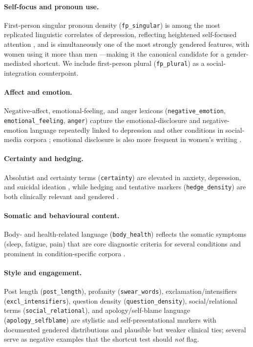 \documentclass[11pt]{article}
\begin{document}
\paragraph{Self-focus and pronoun use.}
First-person singular pronoun density (\texttt{fp\_singular}) is among the most replicated linguistic correlates of depression, reflecting heightened self-focused attention \citep{rude2004language,tausczik2010liwc}, and is simultaneously one of the most strongly gendered features, with women using it more than men \citep{newman2008gender,schwartz2013personality}---making it the canonical candidate for a gender-mediated shortcut. We include first-person plural (\texttt{fp\_plural}) as a social-integration counterpoint.

\paragraph{Affect and emotion.}
Negative-affect, emotional-feeling, and anger lexicons (\texttt{negative\_emotion}, \texttt{emotional\_feeling}, \texttt{anger}) capture the emotional-disclosure and negative-emotion language repeatedly linked to depression and other conditions in social-media corpora \citep{coppersmith,cohan,rude2004language}; emotional disclosure is also more frequent in women's writing \citep{newman2008gender}.

\paragraph{Certainty and hedging.}
Absolutist and certainty terms (\texttt{certainty}) are elevated in anxiety, depression, and suicidal ideation \citep{almosaiwi2018absolutist}, while hedging and tentative markers (\texttt{hedge\_density}) are both clinically relevant and gendered \citep{newman2008gender}.

\paragraph{Somatic and behavioural content.}
Body- and health-related language (\texttt{body\_health}) reflects the somatic symptoms (sleep, fatigue, pain) that are core diagnostic criteria for several conditions and prominent in condition-specific corpora \citep{cohan,koloski2024mindset}.

\paragraph{Style and engagement.}
Post length (\texttt{post\_length}), profanity (\texttt{swear\_words}), exclamation/intensifiers (\texttt{excl\_intensifiers}), question density (\texttt{question\_density}), social/relational terms (\texttt{social\_relational}), and apology/self-blame language (\texttt{apology\_selfblame}) are stylistic and self-presentational markers with documented gendered distributions \citep{newman2008gender,park2016women} and plausible but weaker clinical ties; several serve as negative examples that the shortcut test should \emph{not} flag.
\end{document}
